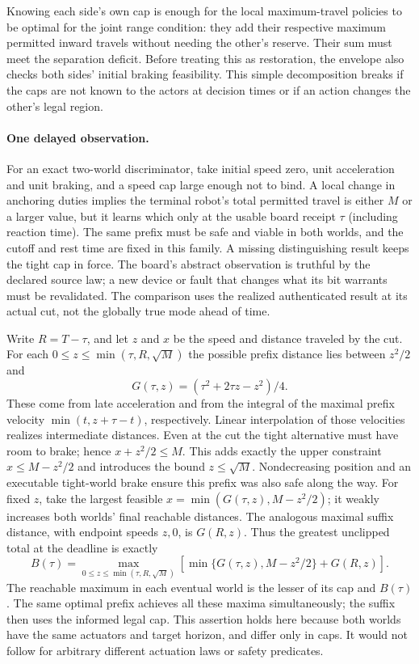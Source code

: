 \documentclass{article}
\begin{document}
Knowing each side's own cap is enough for the local maximum-travel policies to be optimal for the joint range condition: they add their respective maximum permitted inward travels without needing the other's reserve. Their sum must meet the separation deficit. Before treating this as restoration, the envelope also checks both sides' initial braking feasibility. This simple decomposition breaks if the caps are not known to the actors at decision times or if an action changes the other's legal region.

\paragraph{One delayed observation.}
For an exact two-world discriminator, take initial speed zero, unit acceleration and unit braking, and a speed cap large enough not to bind. A local change in anchoring duties implies the terminal robot's total permitted travel is either $M$ or a larger value, but it learns which only at the usable board receipt $\tau$ (including reaction time). The same prefix must be safe and viable in both worlds, and the cutoff and rest time are fixed in this family. A missing distinguishing result keeps the tight cap in force. The board's abstract observation is truthful by the declared source law; a new device or fault that changes what its bit warrants must be revalidated. The comparison uses the realized authenticated result at its actual cut, not the globally true mode ahead of time.

Write $R=T-\tau$, and let $z$ and $x$ be the speed and distance traveled by the cut. For each $0\le z\le\min(\tau,R,\sqrt M)$ the possible prefix distance lies between $z^2/2$ and
\[
G(\tau,z)=(\tau^2+2\tau z-z^2)/4.
\]
These come from late acceleration and from the integral of the maximal prefix velocity $\min(t,z+\tau-t)$, respectively. Linear interpolation of those velocities realizes intermediate distances. Even at the cut the tight alternative must have room to brake; hence $x+z^2/2\le M$. This adds exactly the upper constraint $x\le M-z^2/2$ and introduces the bound $z\le\sqrt M$. Nondecreasing position and an executable tight-world brake ensure this prefix was also safe along the way. For fixed $z$, take the largest feasible $x=\min(G(\tau,z),M-z^2/2)$; it weakly increases both worlds' final reachable distances. The analogous maximal suffix distance, with endpoint speeds $z,0$, is $G(R,z)$. Thus the greatest unclipped total at the deadline is exactly
\[
 B(\tau)=\max_{0\le z\le\min(\tau,R,\sqrt M)}
       \left[\min\{G(\tau,z),M-z^2/2\}+G(R,z)\right].
\]
The reachable maximum in each eventual world is the lesser of its cap and $B(\tau)$. The same optimal prefix achieves all these maxima simultaneously; the suffix then uses the informed legal cap. This assertion holds here because both worlds have the same actuators and target horizon, and differ only in caps. It would not follow for arbitrary different actuation laws or safety predicates.
\end{document}
